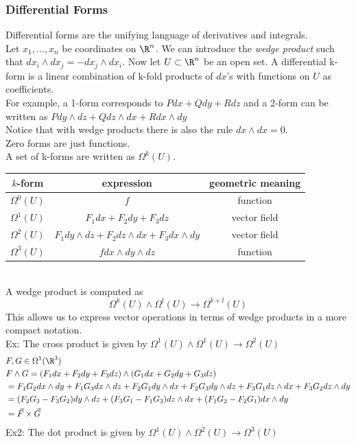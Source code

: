 \subsubsection{Differential Forms}
Differential forms are the unifying language of derivatives and integrals.\\
Let $x_1,\ldots,x_n$ be coordinates on $\R^n$. We can introduce the \textit{wedge product} such that $dx_i\wedge dx_j=-dx_j\wedge dx_i$. Now let $U\subset\R^n$ be an open set. A differential k-form is a linear combination of k-fold products of $dx$'s with functions on $U$ as coefficients.\\
For example, a 1-form corresponds to $Pdx+Qdy+Rdz$ and a 2-form can be written as $Pdy\wedge dz+Qdz\wedge dx+Rdx\wedge dy$\\
Notice that with wedge products there is also the rule $dx\wedge dx=0$.\\
Zero forms are just functions.\\
A set of k-forms are written as $\Omega^k(U)$.\\
\begin{tabular}{c|c|c}
    $k$-form & expression & geometric meaning\\
    \hline
    $\Omega^0(U)$ & $f$ & function\\
    $\Omega^1(U)$ & $F_1dx+F_2dy+F_3dz$ & vector field\\
    $\Omega^2(U)$ & $F_1dy\wedge dz+F_2dz\wedge dx+F_3dx\wedge dy$ & vector field\\
    $\Omega^3(U)$ & $fdx\wedge dy\wedge dz$ & function
\end{tabular}\\
A wedge product is computed as 
$$\Omega^k(U)\wedge\Omega^l(U)\to\Omega^{k+l}(U)$$
This allows us to express vector operations in terms of wedge products in a more compact notation.\\
Ex: The cross product is given by $\Omega^1(U)\wedge\Omega^1(U)\to\Omega^2(U)$
\begin{align*}
    &F,G\in\Omega^1(\R^3)\\
    &F\wedge G=(F_1dx+F_2dy+F_3dz)\wedge(G_1dx+G_2dy+G_3dz)\\
    &=F_1G_2dx\wedge dy+F_1G_3dx\wedge dz+F_2G_1dy\wedge dx+F_2G_3dy\wedge dz+F_3G_1dz\wedge dx+F_3G_2dz\wedge dy\\
    &=(F_2G_3-F_3G_2)dy\wedge dz+(F_3G_1-F_1G_3)dz\wedge dx+(F_1G_2-F_2G_1)dx\wedge dy\\
    &=\vec{F}\times\vec{G}
\end{align*}
Ex2: The dot product is given by $\Omega^1(U)\wedge\Omega^2(U)\to\Omega^3(U)$
